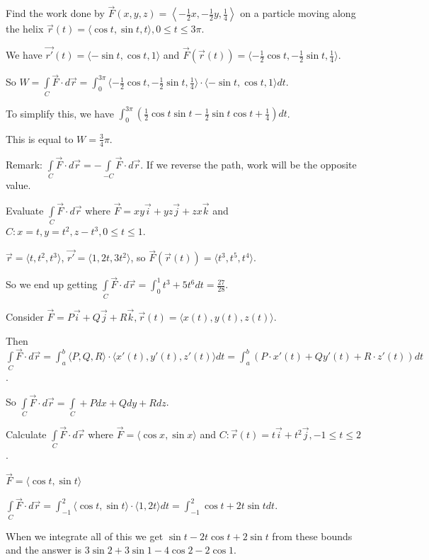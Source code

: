 \documentclass[../calc3.tex]{subfiles}
\begin{document}
\begin{example}
    Find the work done by $\vec{F}(x,y,z)=\left\langle -\frac{1}{2}x, -\frac{1}{2}y, \frac{1}{4}\right\rangle$ on a particle moving along the helix $\vec{r}(t)=\langle \cos t,\sin t, t\rangle, 0\leq t\leq 3\pi$.

    We have $\vec{r'}(t)=\langle -\sin t,\cos t, 1\rangle$ and $\vec{F}(\vec{r}(t))=\langle -\frac{1}{2}\cos t,-\frac{1}{2}\sin t,\frac{1}{4}\rangle$.

    So $W=\int\limits_C \vec{F}\cdot d\vec{r}=\int_0^{3\pi}\langle -\frac{1}{2}\cos t,-\frac{1}{2}\sin t,\frac{1}{4}\rangle\cdot \langle -\sin t,\cos t,1\rangle dt$.

    To simplify this, we have $\int_0^{3\pi}(\frac{1}{2}\cos t\sin t-\frac{1}{2}\sin t\cos t+\frac{1}{4})dt$.

    This is equal to $W=\frac{3}{4}\pi$.
\end{example}

Remark: $\int\limits_{C}\vec{F}\cdot d\vec{r}=-\int\limits_{-C}\vec{F}\cdot d\vec{r}$. If we reverse the path, work will be the opposite value.

\begin{example}
    Evaluate $\int\limits_{C}\vec{F}\cdot d\vec{r}$ where $\vec{F}=xy\vec{i}+yz\vec{j}+zx\vec{k}$ and $C:x=t, y=t^2,z-t^3,0\leq t\leq 1$.

    $\vec{r}=\langle t,t^2,t^3\rangle$, $\vec{r'}=\langle 1,2t,3t^2\rangle$, so $\vec{F}(\vec{r}(t))=\langle t^3,t^5,t^4\rangle$.

    So we end up getting $\int\limits_{C}\vec{F}\cdot d\vec{r}=\int_0^1 t^3+5t^6dt =\frac{27}{28}$.
\end{example}

Consider $\vec{F}=P\vec{i}+Q\vec{j}+R\vec{k}, \vec{r}(t)=\langle x(t),y(t),z(t)\rangle$.

Then $\int\limits_{C}\vec{F}\cdot d\vec{r}=\int_a^b \langle P,Q,R\rangle\cdot \langle x'(t),y'(t),z'(t)\rangle dt = \int_a^b (P\cdot x'(t)+Qy'(t)+R\cdot z'(t))dt$.

So $\int\limits_{C}\vec{F}\cdot d\vec{r}=\int\limits_{C}+Pdx+Qdy+Rdz$.

\begin{example}
    Calculate $\int\limits_{C}\vec{F}\cdot d\vec{r}$ where $\vec{F}=\langle \cos x,\sin x\rangle$ and $C: \vec{r}(t)=t\vec{i}+t^2\vec{j}, -1\leq t\leq 2$.
    
    $\vec{F}=\langle \cos t, \sin t\rangle$

    $\int\limits_{C}\vec{F}\cdot d\vec{r}=\int_{-1}^2 \langle \cos t, \sin t\rangle \cdot \langle 1,2t\rangle dt = \int_{-1}^2 \cos t + 2t\sin t dt$.

    When we integrate all of this we get $\sin t-2t\cos t+2\sin t$ from these bounds and the answer is $3\sin 2+3\sin 1-4\cos 2-2\cos 1$.
\end{example}
\end{document}
